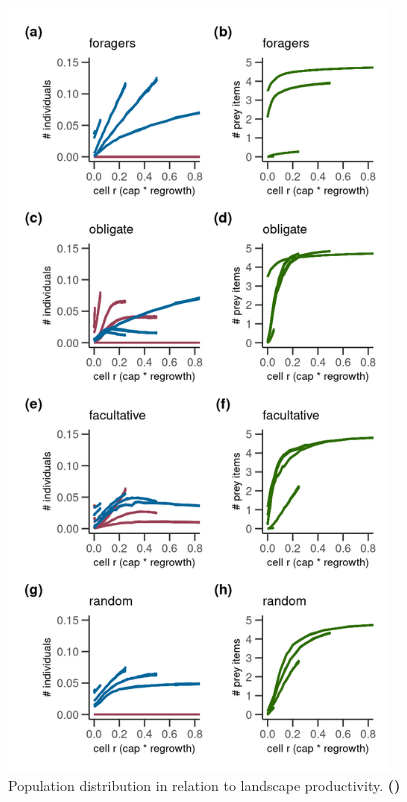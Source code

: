 \documentclass[11pt]{article}
\begin{document}
\begin{figure}[h!]
    \centering
    \includegraphics[width=0.90\textwidth]{figures/fig_05_agent_distribution.png}
    \caption{Population distribution in relation to landscape productivity.
    \textbf{()}}
    \label{Fig:AgentDistribution}
\end{figure}

\end{document}
